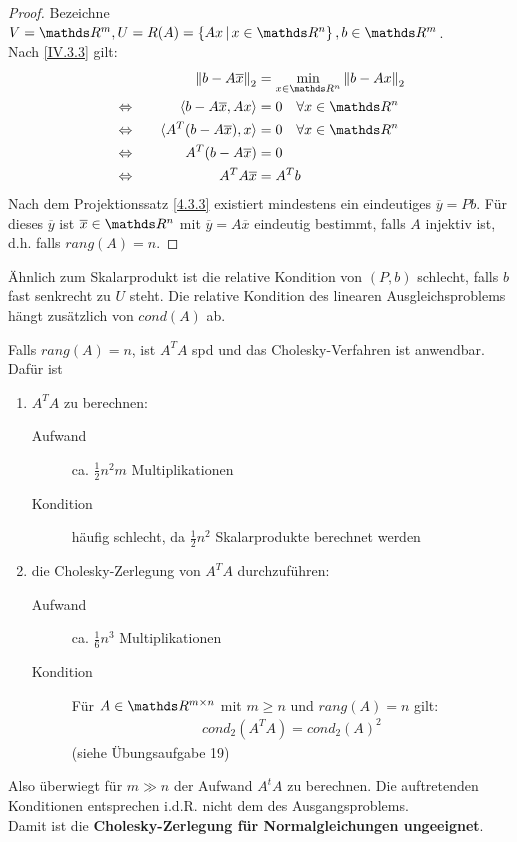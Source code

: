 \begin{proof} Bezeichne
  $V= \R^m, U= R(A) = \left\{Ax \, \middle|  \, x \in\Ren \right\}, b \in \R^m$.\\
  Nach \eqref{IV.3.3} gilt:
  \begin{alignat*}{2}
    &&\nn{b-A\overline{x}}_2 &= \min_{x\in\Ren} \nn{b-Ax}_2 \\
    &\Leftrightarrow \quad & \scp{b-A \overline{x}}{Ax} &= 0 \quad \forall x\in \Ren \\
    &\Leftrightarrow & \scp{A^T(b-A\overline{x})}{x} &= 0 \quad  \forall x\in\Ren \\
    &\Leftrightarrow & A^T(b-A\overline{x}) &= 0 \\
    &\Leftrightarrow & A^TA\overline{x} &= A^Tb
  \end{alignat*}
  Nach dem Projektionssatz \ref{4.3.3} existiert mindestens ein eindeutiges
  $\overline{y} = P b$.
  Für dieses $\overline{y}$ ist $\overline{x}\in \Ren $ mit $\overline{y} = A\overline{x}$
  eindeutig bestimmt, falls $A$ injektiv ist, d.h. falls $rang(A) = n$. 
\end{proof}

Ähnlich zum Skalarprodukt ist die relative Kondition von $(P,b) $ schlecht, 
falls $b$ fast senkrecht zu $U$ steht.
Die relative Kondition des linearen Ausgleichsproblems hängt zusätzlich von $cond(A)$ ab.


Falls $rang(A) = n$, ist $A^TA$ spd und das Cholesky-Verfahren ist anwendbar. \\
Dafür ist
\begin{enumerate}[1.]
\item $A^TA$ zu berechnen:
  \begin{description}
  \item[Aufwand] ca. $\frac{1}{2}n^2m$ Multiplikationen 
  \item[Kondition] häufig schlecht, da $\frac{1}{2}n^2$ Skalarprodukte berechnet werden
  \end{description}
\item die Cholesky-Zerlegung von $A^TA $ durchzuführen:
  \begin{description}
  \item[Aufwand] ca. $\frac{1}{6}n^3$ Multiplikationen 
  \item[Kondition] Für $A\in\R^{m\times n}$ mit $m\geq n$ und $rang(A)=n$ gilt:
    \begin{gather}
      cond_2(A^TA) = cond_2(A)^2 \label{IV.3.7}
    \end{gather}
    (siehe Übungsaufgabe 19)
  \end{description}
\end{enumerate}
Also überwiegt für $m\gg n$ der Aufwand $A^tA$ zu berechnen.
Die auftretenden Konditionen entsprechen i.d.R. nicht dem des Ausgangsproblems.\\
Damit ist die 
\textbf{Cholesky-Zerlegung  für Normalgleichungen ungeeignet}.



